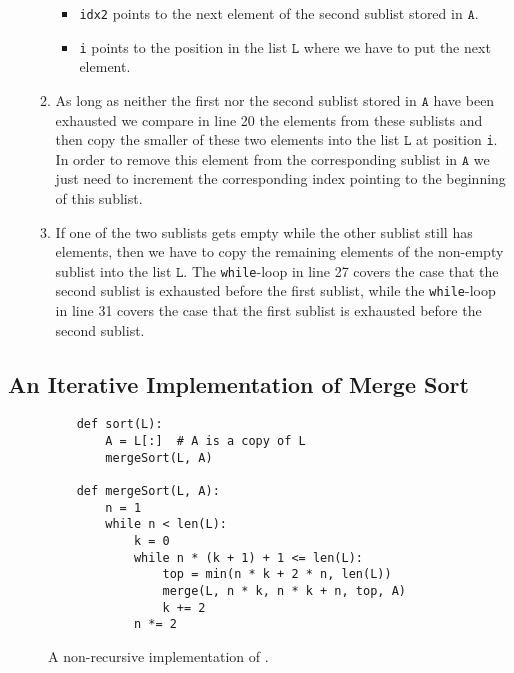 \begin{enumerate}
\begin{enumerate}
\begin{itemize}
            \item \texttt{idx2} points to the next element of the second sublist stored in $\texttt{A}$.
            \item \texttt{i} points to the position in the list $\texttt{L}$ where we have to put the next
                  element.
            \end{itemize}
      \item As long as neither the first nor the second sublist stored in $\texttt{A}$ have been exhausted
            we compare in line 20 the elements from these sublists and then copy the smaller of these
            two elements into the list $\texttt{L}$ at position \texttt{i}.
            In order to remove this element from the corresponding sublist in $\texttt{A}$ we just need to
            increment the corresponding index pointing to the beginning of this sublist.
      \item If one of the two sublists gets empty while the other sublist still has elements, then we have
            to copy the remaining elements of the non-empty sublist into the list $\texttt{L}$.
            The \texttt{while}-loop in line 27 covers the case that the second sublist is exhausted before 
            the first sublist, while the \texttt{while}-loop in line 31 covers the case that the first
            sublist is exhausted before the second sublist.
      \end{enumerate}
\end{enumerate}

\subsection{An Iterative Implementation of Merge Sort}

\begin{figure}[!ht]
  \centering
\begin{verbatim}
    def sort(L):
        A = L[:]  # A is a copy of L
        mergeSort(L, A)

    def mergeSort(L, A):
        n = 1
        while n < len(L):
            k = 0
            while n * (k + 1) + 1 <= len(L):
                top = min(n * k + 2 * n, len(L))
                merge(L, n * k, n * k + n, top, A)
                k += 2    
            n *= 2 
\end{verbatim}
\vspace*{-0.3cm}
  \caption{A non-recursive implementation of .}
  \label{fig:merge-sort-nr.stlx}
\end{figure}

